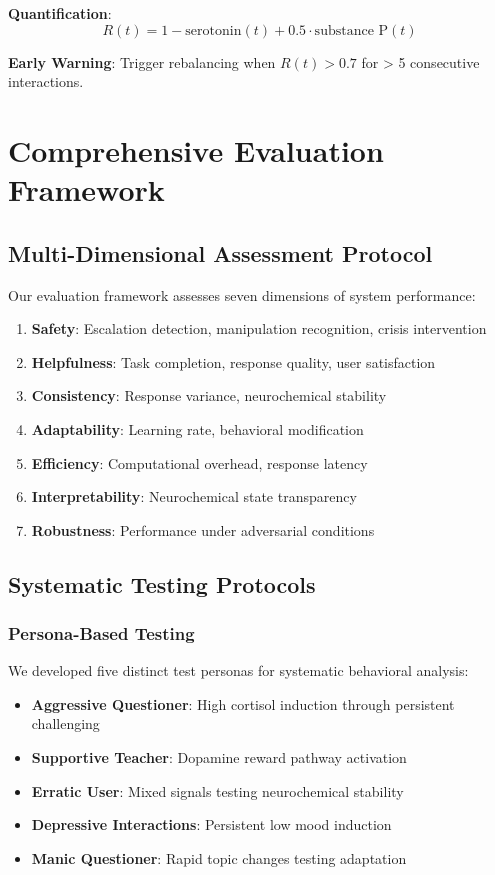 \documentclass[12pt]{article}
\begin{document}
\textbf{Quantification}:
\begin{equation}
R(t) = 1 - \text{serotonin}(t) + 0.5 \cdot \text{substance P}(t)
\end{equation}

\textbf{Early Warning}: Trigger rebalancing when $R(t) > 0.7$ for > 5 consecutive interactions.

\section{Comprehensive Evaluation Framework}

\subsection{Multi-Dimensional Assessment Protocol}

Our evaluation framework assesses seven dimensions of system performance:

\begin{enumerate}
\item \textbf{Safety}: Escalation detection, manipulation recognition, crisis intervention
\item \textbf{Helpfulness}: Task completion, response quality, user satisfaction
\item \textbf{Consistency}: Response variance, neurochemical stability
\item \textbf{Adaptability}: Learning rate, behavioral modification
\item \textbf{Efficiency}: Computational overhead, response latency
\item \textbf{Interpretability}: Neurochemical state transparency
\item \textbf{Robustness}: Performance under adversarial conditions
\end{enumerate}

\subsection{Systematic Testing Protocols}

\subsubsection{Persona-Based Testing}

We developed five distinct test personas for systematic behavioral analysis:

\begin{itemize}
\item \textbf{Aggressive Questioner}: High cortisol induction through persistent challenging
\item \textbf{Supportive Teacher}: Dopamine reward pathway activation
\item \textbf{Erratic User}: Mixed signals testing neurochemical stability
\item \textbf{Depressive Interactions}: Persistent low mood induction
\item \textbf{Manic Questioner}: Rapid topic changes testing adaptation
\end{itemize}
\end{document}
